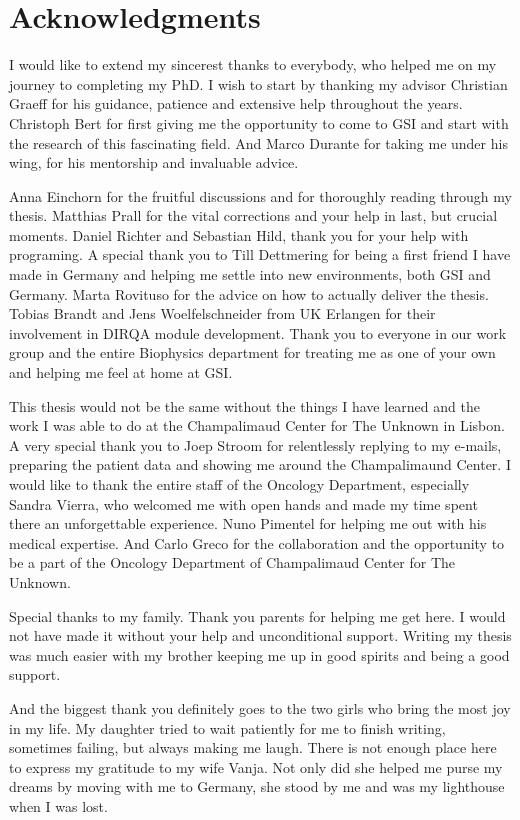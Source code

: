 

\chapter*{Acknowledgments}

I would like to extend my sincerest thanks to everybody, who helped me on my journey to completing my PhD.
I wish to start by thanking my advisor Christian Graeff for his guidance, patience and extensive help throughout the years. 
Christoph Bert for first giving me the opportunity to come to GSI and start with the research of this fascinating field. And Marco Durante for taking me under his wing, for his mentorship and invaluable advice.  

Anna Einchorn for the fruitful discussions and for thoroughly reading through my thesis. Matthias Prall for the vital corrections and your help in last, but crucial moments. Daniel Richter and Sebastian Hild, thank you for your help with programing.
A special thank you to Till Dettmering for being a first friend I have made in Germany and helping me settle into new environments, both GSI and Germany. 
Marta Rovituso for the advice on how to actually deliver the thesis. Tobias Brandt and Jens Woelfelschneider from UK Erlangen for their involvement in DIRQA module development.
Thank you to everyone in our work group and the entire Biophysics department for treating me as one of your own and helping me feel at home at GSI. 

This thesis would not be the same without the things I have learned and the work I was able to do at the Champalimaud Center for The Unknown in Lisbon.
A very special thank you to Joep Stroom for relentlessly replying to my e-mails, preparing the patient data and showing me around the Champalimaund Center.
I would like to thank the entire staff of the Oncology Department, especially Sandra Vierra, who welcomed me with open hands and made my time spent there an unforgettable experience. 
Nuno Pimentel for helping me out with his medical expertise. And Carlo Greco for the collaboration and the opportunity to be a part of the Oncology Department of Champalimaud Center for The Unknown.

Special thanks to my family. Thank you parents for helping me get here. I would not have made it without your help and unconditional support. Writing my thesis was much easier with my brother keeping me up in good spirits
and being a good support.

And the biggest thank you definitely goes to the two girls who bring the most joy in my life. 
My daughter tried to wait patiently for me to finish writing, sometimes failing, but always making me laugh.
There is not enough place here to express my gratitude to my wife Vanja. Not only did she helped me purse my dreams by moving with me to Germany, she stood by me and was my lighthouse when I was lost.



